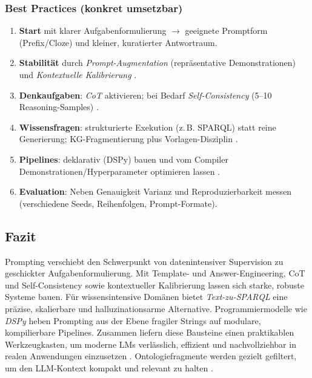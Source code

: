 \subsubsection*{Best Practices (konkret umsetzbar)}
\begin{enumerate}
  \item \textbf{Start} mit klarer Aufgabenformulierung \(\rightarrow\) geeignete Promptform (Prefix/Cloze) und kleiner, kuratierter Antwortraum.
  \item \textbf{Stabilität} durch \emph{Prompt-Augmentation} (repräsentative Demonstrationen) und \emph{Kontextuelle Kalibrierung} \cite{zhao2021calibrate}.
  \item \textbf{Denkaufgaben}: \emph{CoT} aktivieren; bei Bedarf \emph{Self-Consistency} (5–10 Reasoning-Samples) \cite{wei2022cot,wang2022selfconsistency}.
  \item \textbf{Wissensfragen}: strukturierte Exekution (z.\,B. SPARQL) statt reine Generierung; KG-Fragmentierung plus Vorlagen-Disziplin \cite{avila2024autokgqagpt}.
  \item \textbf{Pipelines}: deklarativ (DSPy) bauen und vom Compiler Demonstrationen/Hyperparameter optimieren lassen \cite{khattab2023dspy}.
  \item \textbf{Evaluation}: Neben Genauigkeit Varianz und Reproduzierbarkeit messen (verschiedene Seeds, Reihenfolgen, Prompt-Formate).
\end{enumerate}

\subsection{Fazit}
Prompting verschiebt den Schwerpunkt von datenintensiver Supervision zu geschickter Aufgabenformulierung. Mit Template- und Answer-Engineering, CoT und Self-Consistency sowie kontextueller Kalibrierung lassen sich starke, robuste Systeme bauen. Für wissensintensive Domänen bietet \emph{Text-zu-SPARQL} eine präzise, skalierbare und halluzinationsarme Alternative. Programmiermodelle wie \emph{DSPy} heben Prompting aus der Ebene fragiler Strings auf modulare, kompilierbare Pipelines. Zusammen liefern diese Bausteine einen praktikablen Werkzeugkasten, um moderne LMs verlässlich, effizient und nachvollziehbar in realen Anwendungen einzusetzen \cite{liu2023survey,wei2022cot,wang2022selfconsistency,zhao2021calibrate,avila2024autokgqagpt,khattab2023dspy}.
Ontologiefragmente werden gezielt gefiltert, um den LLM-Kontext kompakt und relevant zu halten \cite{avila2024autokgqagpt}.





